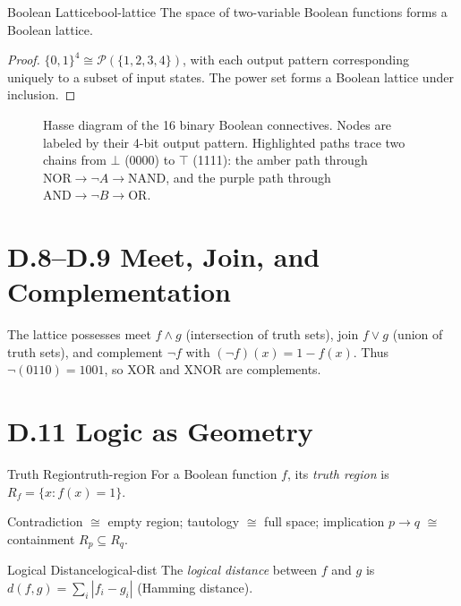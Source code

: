 \begin{theorem}{Boolean Lattice}{bool-lattice}
  The space of two-variable Boolean functions forms a Boolean lattice.
\end{theorem}

\begin{proof}
  $\{0,1\}^4 \cong \mathcal{P}(\{1,2,3,4\})$, with each output pattern
  corresponding uniquely to a subset of input states. The power set forms a
  Boolean lattice under inclusion.
\end{proof}

\begin{figure}[h]
  \centering
  \begin{tikzpicture}[scale=0.85]
    
  \end{tikzpicture}
  \caption{Hasse diagram of the 16 binary Boolean connectives. Nodes are
    labeled by their 4-bit output pattern. Highlighted paths trace two
    chains from $\bot$ (0000) to $\top$ (1111): the amber path through
    $\mathrm{NOR} \to \neg A \to \mathrm{NAND}$, and the purple path
    through $\mathrm{AND} \to \neg B \to \mathrm{OR}$.}
  \label{fig:hasse-appd}
\end{figure}

\section*{D.8–D.9 Meet, Join, and Complementation}

The lattice possesses meet $f \wedge g$ (intersection of truth sets),
join $f \vee g$ (union of truth sets), and complement $\neg f$ with
$(\neg f)(x) = 1 - f(x)$. Thus $\neg(0110) = 1001$, so XOR and XNOR are
complements.

\section*{D.11 Logic as Geometry}

\begin{definition}{Truth Region}{truth-region}
  For a Boolean function $f$, its \emph{truth region} is
  $R_f = \{x : f(x) = 1\}$.
\end{definition}

Contradiction $\cong$ empty region; tautology $\cong$ full space;
implication $p \to q$ $\cong$ containment $R_p \subseteq R_q$.

\begin{definition}{Logical Distance}{logical-dist}
  The \emph{logical distance} between $f$ and $g$ is
  $d(f,g) = \sum_i |f_i - g_i|$ (Hamming distance).
\end{definition}

